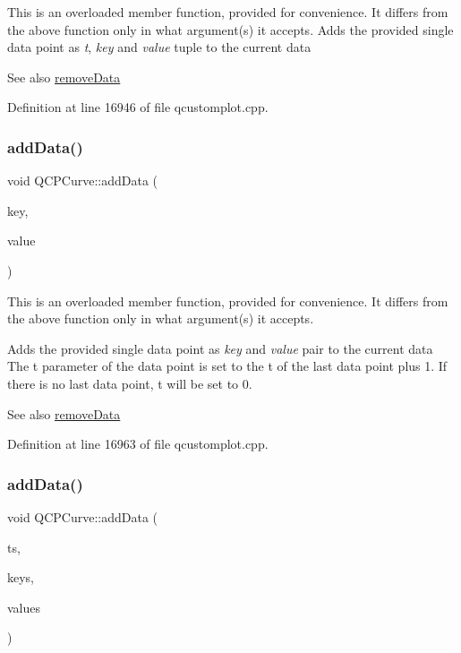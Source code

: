 This is an overloaded member function, provided for convenience. It differs from the above function only in what argument(s) it accepts. Adds the provided single data point as {\itshape t}, {\itshape key} and {\itshape value} tuple to the current data \begin{DoxySeeAlso}{See also}
\hyperlink{class_q_c_p_curve_ad45bb5479be799163028ef2b776f7221}{remove\+Data} 
\end{DoxySeeAlso}


Definition at line 16946 of file qcustomplot.\+cpp.

\mbox{\label{class_q_c_p_curve_ada4762e793cd5707b33f35b8a4b0f8fb}} 
\subsubsection{\texorpdfstring{add\+Data()}{addData()}\hspace{0.1cm}{\footnotesize\ttfamily [4/5]}}
{\footnotesize\ttfamily void Q\+C\+P\+Curve\+::add\+Data (\begin{DoxyParamCaption}\item[{double}]{key,  }\item[{double}]{value }\end{DoxyParamCaption})}

This is an overloaded member function, provided for convenience. It differs from the above function only in what argument(s) it accepts.

Adds the provided single data point as {\itshape key} and {\itshape value} pair to the current data The t parameter of the data point is set to the t of the last data point plus 1. If there is no last data point, t will be set to 0.

\begin{DoxySeeAlso}{See also}
\hyperlink{class_q_c_p_curve_ad45bb5479be799163028ef2b776f7221}{remove\+Data} 
\end{DoxySeeAlso}


Definition at line 16963 of file qcustomplot.\+cpp.

\mbox{\label{class_q_c_p_curve_a27c8b3dddd4067d626397ee199626722}} 
\subsubsection{\texorpdfstring{add\+Data()}{addData()}\hspace{0.1cm}{\footnotesize\ttfamily [5/5]}}
{\footnotesize\ttfamily void Q\+C\+P\+Curve\+::add\+Data (\begin{DoxyParamCaption}\item[{const Q\+Vector$<$ double $>$ \&}]{ts,  }\item[{const Q\+Vector$<$ double $>$ \&}]{keys,  }\item[{const Q\+Vector$<$ double $>$ \&}]{values }\end{DoxyParamCaption})}

